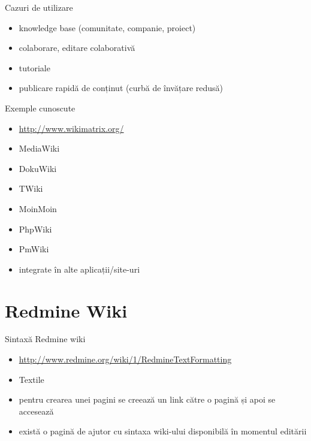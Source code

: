 \documentclass{beamer}
\begin{document}
\begin{frame}{Cazuri de utilizare}
  \begin{itemize}
    \item knowledge base (comunitate, companie, proiect)
    \item colaborare, editare colaborativă
    \item tutoriale
    \item publicare rapidă de conținut (curbă de învățare redusă)
  \end{itemize}
\end{frame}

\begin{frame}{Exemple cunoscute}
  \begin{itemize}
    \item \url{http://www.wikimatrix.org/}
    \item MediaWiki
    \item DokuWiki
    \item TWiki
    \item MoinMoin
    \item PhpWiki
    \item PmWiki
    \item integrate în alte aplicații/site-uri
  \end{itemize}
\end{frame}

\section{Redmine Wiki}

\begin{frame}{Sintaxă Redmine wiki}
  \begin{itemize}
    \item \url{http://www.redmine.org/wiki/1/RedmineTextFormatting}
    \item Textile
    \item pentru crearea unei pagini se creează un link către o pagină și apoi
se accesează
    \item există o pagină de ajutor cu sintaxa wiki-ului disponibilă în
momentul editării
  \end{itemize}
\end{frame}
\end{document}

